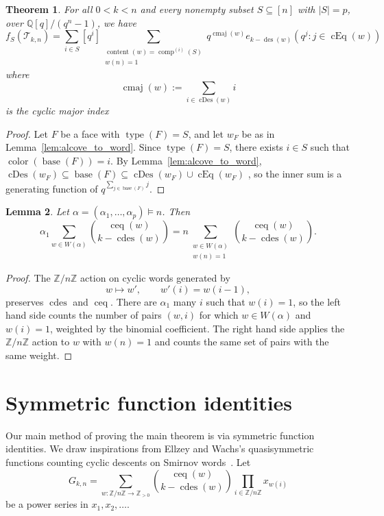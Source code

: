 \documentclass[12pt,reqno]{amsart}
\theoremstyle{plain}
\newtheorem{theorem}{Theorem}[section]
\newtheorem{lemma}[theorem]{Lemma}
\theoremstyle{definition}
\newcommand{\Z}{\mathbb{Z}}
\newcommand{\Q}{\mathbb{Q}}
\newcommand{\Tri}{\mathcal{T}_{k,n}}
\DeclareMathOperator{\des}{des}
\DeclareMathOperator{\typ}{type}
\DeclareMathOperator{\comp}{comp}
\DeclareMathOperator{\base}{base}
\DeclareMathOperator{\cEq}{cEq}
\DeclareMathOperator{\cDes}{cDes}
\DeclareMathOperator{\col}{color}
\DeclareMathOperator{\cdes}{cdes}
\DeclareMathOperator{\ceq}{ceq}
\DeclareMathOperator{\cmaj}{cmaj}
\DeclareMathOperator{\content}{content}
\begin{document}
\begin{theorem}
	For all $ 0 < k < n $
	and every nonempty subset $ S \subseteq[n] $ with $ |S| = p $, over $\Q[q]/(q^n-1) $, we have
	\begin{equation}
		f_S(\Tri) = \sum_{i \in S} [q^i] \sum_{\substack{\content(w) = \comp^{(i)}(S) \\ w(n) = 1}} q^{\cmaj(w)} e_{k-\des(w)}\left( q^j: j \in \cEq(w) \right)
	\end{equation}
	where
	\begin{equation}
		\cmaj(w):= \sum_{i \in \cDes(w)} i
	\end{equation}
	is the \emph{cyclic major index}
\end{theorem}
\begin{proof}
	Let $ F $ be a face with $ \typ(F) = S $, and let $ w_F $
	be as in Lemma~\ref{lem:alcove_to_word}. Since $ \typ(F) = S $, there exists $ i \in S $ such that $ \col(\base(F)) = i $.
	By Lemma~\ref{lem:alcove_to_word}, $
		\cDes(w_F) \subseteq \base(F) \subseteq \cDes(w_F) \cup \cEq(w_F) $
, so the inner sum is a generating function of $
		q^{\sum_{j \in \base(F)} j} $.
\end{proof}

\begin{lemma}\label{lem:alphap}
	Let $ \alpha = (\alpha_1,\dots,\alpha_p) \models n $. Then
	\begin{equation}
		\alpha_1 \sum_{w \in W(\alpha)} \binom{\ceq(w)}{k-\cdes(w)} = n \sum_{\substack{w \in W(\alpha) \\ w(n) = 1}} \binom{\ceq(w)}{k - \cdes(w)}.
	\end{equation}
\end{lemma}
\begin{proof}
	The $\Z/n\Z$ action on cyclic words generated by
	\begin{equation}\label{eq:nZaction}
		w \mapsto w', \qquad w'(i) = w(i-1),
	\end{equation}
	preserves $\cdes$ and $\ceq$.
	There are $\alpha_1$ many $i$ such that $w(i) = 1$, so the left hand side counts the number of pairs $(w,i)$ for which $w\in W(\alpha)$ and $w(i) = 1$, weighted by the binomial coefficient.
	The right hand side applies the $\Z/n\Z$ action to $w$ with $w(n) = 1$ and counts the same set of pairs with the same weight.
\end{proof}

\section{Symmetric function identities}\label{sec:symm}
Our main method of proving the main theorem is via symmetric function identities. We draw inspirations from Ellzey and
Wachs's quasisymmetric functions counting cyclic descents on Smirnov words~\cite{ellzey,EllzeyWachs}. Let
\begin{equation}\label{eq:Gkn}
	G_{k,n} = \sum_{w: \Z/n\Z \to \Z_{>0}} \binom{\ceq(w)}{k - \cdes(w)} \prod_{i \in \Z/n\Z} x_{w(i)}
\end{equation}
be a power series in $x_1,x_2,\dots$.
\end{document}
